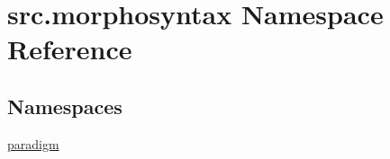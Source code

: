 \hypertarget{namespacesrc_1_1morphosyntax}{\section{src.\+morphosyntax Namespace Reference}
\label{namespacesrc_1_1morphosyntax}
}
\subsection*{Namespaces}
\begin{DoxyCompactItemize}
\item 
 \hyperlink{namespacesrc_1_1morphosyntax_1_1paradigm}{paradigm}
\end{DoxyCompactItemize}
